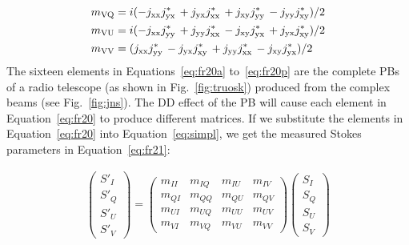 \begin{subequations}
\begin{align}
  m_{\rm VQ} & = i(-j_{\rm xx}j_{\rm yx}^{*}\, + j_{\rm yx}j_{\rm xx}^{*}\, + j_{\rm xy}j_{\rm yy}^{*}\, - j_{\rm yy}j_{\rm xy}^{*})/2 	\label{eq:fr20n}\\
  m_{\rm VU} & = i(-j_{\rm xx}j_{\rm yy}^{*}\, + j_{\rm yy}j_{\rm xx}^{*}\, - j_{\rm xy}j_{\rm yx}^{*}\, + j_{\rm yx}j_{\rm xy}^{*})/2 	 \label{eq:fr20o}\\
  m_{\rm VV} & = (j_{\rm xx}j_{\rm yy}^{*}\, - j_{\rm yx}j_{\rm xy}^{*}\, + j_{\rm yy}j_{\rm xx}^{*}\, - j_{\rm xy}j_{\rm yx}^{*})/2  	\label{eq:fr20p} 
 \end{align}
\end{subequations}
%
The sixteen elements in Equations~\ref{eq:fr20a} to~\ref{eq:fr20p} are the complete PBs of a radio telescope (as shown in Fig.~\ref{fig:truosk}) produced from the complex beams 
(see Fig.~\ref{fig:jns}). The DD effect of the PB will cause each element in Equation~\ref{eq:fr20} to produce different matrices. 
If we substitute the elements in Equation~\ref{eq:fr20} into Equation~\ref{eq:simpl}, we get the measured Stokes parameters in Equation~\ref{eq:fr21}:

\begin{eqnarray} \left( \begin{array}{c}
                         S'_{I}\\
                         S'_{Q}\\
                         S'_{U}\\
                         S'_{V}
                        \end{array} \right) =
\left( \begin{array}{cccc}
                        m_{II} & m_{IQ} & m_{IU} & m_{IV} \\
                        m_{QI} & m_{QQ} & m_{QU} & m_{QV} \\
                        m_{UI} & m_{UQ} & m_{UU} & m_{UV} \\
                        m_{VI} & m_{VQ} & m_{VU} & m_{VV} \end{array} \right)                     
                     \left( \begin{array}{c}
                         S_{I}\\
                         S_{Q}\\
                         S_{U}\\
                         S_{V}
                        \end{array} \right)  \label{eq:fr21}
\end{eqnarray} 

